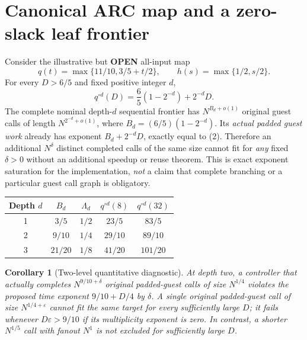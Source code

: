 \documentclass[11pt]{article}
\newtheorem{corollary}[theorem]{Corollary}
\newcommand{\OPEN}{\textbf{OPEN}}
\begin{document}
\section{Canonical ARC map and a zero-slack leaf frontier}
Consider the illustrative but \OPEN{} all-input map
\[
 q(t)=\max\{11/10,3/5+t/2\},\qquad
 h(s)=\max\{1/2,s/2\}.
\]
For every $D>6/5$ and fixed positive integer $d$,
\[
 \boxed{q^{\circ d}(D)
 = \frac65\left(1-2^{-d}\right)+2^{-d}D.} \tag{2}
\]
The complete nominal depth-$d$ sequential frontier has $N^{B_d+o(1)}$
original guest calls of length $N^{2^{-d}+o(1)}$, where
$B_d=(6/5)(1-2^{-d})$. Its \emph{actual padded guest work} already has
exponent $B_d+2^{-d}D$, exactly equal to (2). Therefore an additional
$N^{\delta}$ distinct completed calls of the same size cannot fit for
\emph{any} fixed $\delta>0$ without an additional speedup or reuse theorem.
This is exact exponent saturation for the implementation, \emph{not} a
claim that complete branching or a particular guest call graph is obligatory.

\begin{center}\begin{tabular}{ccccc}\toprule
Depth $d$ & $B_d$ & $\Lambda_d$ & $q^{\circ d}(8)$ & $q^{\circ d}(32)$\\
\midrule
1 & $3/5$ & $1/2$ & $23/5$ & $83/5$\\
2 & $9/10$ & $1/4$ & $29/10$ & $89/10$\\
3 & $21/20$ & $1/8$ & $41/20$ & $101/20$\\
\bottomrule\end{tabular}\end{center}

\begin{corollary}[Two-level quantitative diagnostic]
At depth two, a controller that actually completes $N^{9/10+\delta}$
original padded-guest calls of size $N^{1/4}$ violates the proposed time
exponent $9/10+D/4$ by $\delta$. A single original padded-guest call of size
$N^{1/4+\varepsilon}$ cannot fit the same target for every sufficiently
large $D$; it fails whenever $D\varepsilon>9/10$ if its multiplicity
exponent is zero. In contrast, a shorter $N^{1/5}$ call with fanout
$N^1$ is not excluded for sufficiently large $D$.
\end{corollary}
\end{document}
